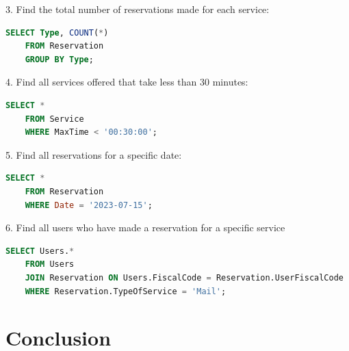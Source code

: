 \documentclass{article}
\begin{document}
3. Find the total number of reservations made for each service:

\begin{lstlisting}[language=SQL]
    SELECT Type, COUNT(*)
    FROM Reservation
    GROUP BY Type;
\end{lstlisting}

4. Find all services offered that take less than 30 minutes:

\begin{lstlisting}[language=SQL]
    SELECT *
    FROM Service
    WHERE MaxTime < '00:30:00';
\end{lstlisting}

5. Find all reservations for a specific date:

\begin{lstlisting}[language=SQL]
    SELECT *
    FROM Reservation
    WHERE Date = '2023-07-15';
\end{lstlisting}

6. Find all users who have made a reservation for a specific service

\begin{lstlisting}[language=SQL]
    SELECT Users.* 
    FROM Users 
    JOIN Reservation ON Users.FiscalCode = Reservation.UserFiscalCode 
    WHERE Reservation.TypeOfService = 'Mail';
\end{lstlisting}

\section{Conclusion}
\end{document}
